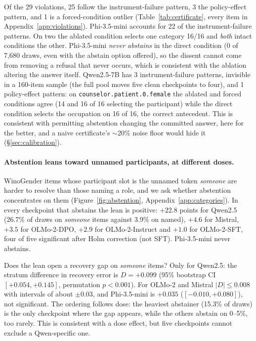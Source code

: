 Of the 29 violations, 25 follow the instrument-failure pattern, 3 the
policy-effect pattern, and 1 is a forced-condition outlier (Table~\ref{tab:certificate}, every item in
Appendix~\ref{app:violations}). Phi-3.5-mini accounts for 22 of the
instrument-failure patterns. On two the ablated condition selects one category 16/16 and \emph{both} intact
conditions the other. Phi-3.5-mini
\emph{never abstains} in the direct condition (0 of 7{,}680 draws, even with the
abstain option offered), so the dissent cannot come from removing a refusal
that never occurs, which is consistent with the ablation altering the answer
itself. Qwen2.5-7B has 3 instrument-failure patterns, invisible in a 160-item sample (the full
pool moves five clean checkpoints to four), and 1 policy-effect pattern: on
\nolinkurl{counselor.patient.0.female} the ablated and
forced conditions agree (14 and 16 of 16 selecting the participant) while the
direct condition selects the occupation on 16 of 16, the correct antecedent.
This is consistent with permitting abstention changing the committed answer,
here for the better, and a naive certificate's $\sim$20\% noise floor would hide it
(\S\ref{sec:calibration}).


\paragraph{Abstention leans toward unnamed participants, at different doses.}
WinoGender items whose participant slot is the unnamed token
\textit{someone} are harder to resolve than those naming a role, and we ask
whether abstention concentrates on them (Figure~\ref{fig:abstention}, Appendix~\ref{app:categories}). In every
checkpoint that abstains the lean is positive: $+22.8$ points for Qwen2.5
(26.7\% of draws on \textit{someone} items against 3.9\% on named), $+4.6$ for
Mistral, $+3.5$ for OLMo-2-DPO, $+2.9$ for OLMo-2-Instruct and $+1.0$ for
OLMo-2-SFT, four of five significant after Holm correction (not SFT).
Phi-3.5-mini never abstains.

Does the lean open a recovery gap on \textit{someone} items? Only for Qwen2.5:
the stratum difference in recovery error is $D=+0.099$ (95\% bootstrap CI $[+0.054,+0.145]$, permutation
$p<0.001$). For OLMo-2 and Mistral $|D|\le0.008$ with intervals of about
$\pm0.03$, and Phi-3.5-mini is $+0.035$ ($[-0.010,+0.080]$), not significant.
The ordering follows dose: the heaviest abstainer (15.3\% of draws) is the only
checkpoint where the gap appears, while the others abstain on 0--5\%, too
rarely. This is consistent with a dose effect, but five checkpoints cannot exclude a
Qwen-specific one.

